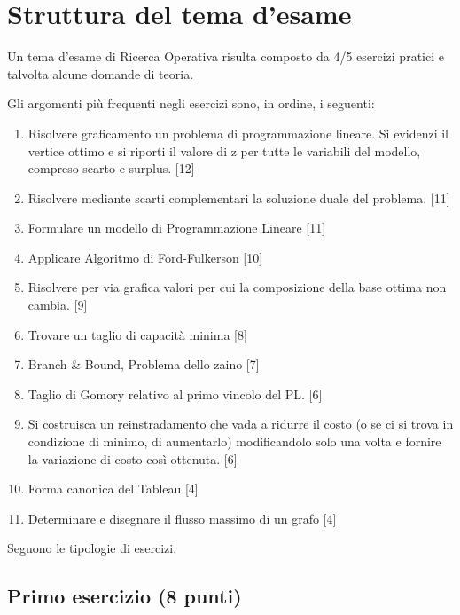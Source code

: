 \documentclass[\main/main.tex]{subfiles}
\begin{document}
\chapter{Struttura del tema d'esame}

Un tema d'esame di Ricerca Operativa risulta composto da 4/5 esercizi pratici e talvolta alcune domande di teoria.

Gli argomenti più frequenti negli esercizi sono, in ordine, i seguenti:

\begin{enumerate}
  \item Risolvere graficamento un problema di programmazione lineare. Si evidenzi il vertice ottimo e si riporti il valore di z per tutte le variabili del modello, compreso scarto e surplus. [12]
  \item Risolvere mediante scarti complementari la soluzione duale del problema. [11]
  \item Formulare un modello di Programmazione Lineare [11]
  \item Applicare Algoritmo di Ford-Fulkerson [10]
  \item Risolvere per via grafica valori per cui la composizione della base ottima non cambia. [9]
  \item Trovare un taglio di capacità minima [8]
  \item Branch \& Bound, Problema dello zaino [7]
  \item Taglio di Gomory relativo al primo vincolo del PL. [6]
  \item Si costruisca un reinstradamento che vada a ridurre il costo (o se ci si trova in condizione di minimo, di aumentarlo) modificandolo solo una volta e fornire la variazione di costo così ottenuta. [6]
  \item Forma canonica del Tableau [4]
  \item Determinare e disegnare il flusso massimo di un grafo [4]
\end{enumerate}

Seguono le tipologie di esercizi.

\section{Primo esercizio (8 punti)}
\end{document}
